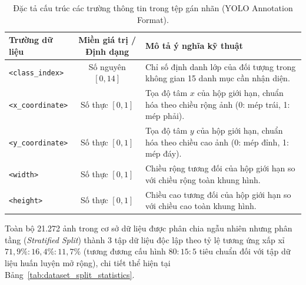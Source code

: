 \documentclass[12pt,a4paper]{article}
\begin{document}
\begin{table}[htbp]
\centering
\caption{Đặc tả cấu trúc các trường thông tin trong tệp gán nhãn (YOLO Annotation Format).}
\label{tab:details_of_annotations}
\small
\begin{tabular}{|l|c|p{8.5cm}|}
\hline
\textbf{Trường dữ liệu} & \textbf{Miền giá trị / Định dạng} & \textbf{Mô tả ý nghĩa kỹ thuật} \\ \hline
\texttt{<class\_index>} & Số nguyên $[0, 14]$ & Chỉ số định danh lớp của đối tượng trong không gian 15 danh mục cần nhận diện. \\ \hline
\texttt{<x\_coordinate>} & Số thực $[0, 1]$ & Tọa độ tâm $x$ của hộp giới hạn, chuẩn hóa theo chiều rộng ảnh (0: mép trái, 1: mép phải). \\ \hline
\texttt{<y\_coordinate>} & Số thực $[0, 1]$ & Tọa độ tâm $y$ của hộp giới hạn, chuẩn hóa theo chiều cao ảnh (0: mép đỉnh, 1: mép đáy). \\ \hline
\texttt{<width>} & Số thực $[0, 1]$ & Chiều rộng tương đối của hộp giới hạn so với chiều rộng toàn khung hình. \\ \hline
\texttt{<height>} & Số thực $[0, 1]$ & Chiều cao tương đối của hộp giới hạn so với chiều cao toàn khung hình. \\ \hline
\end{tabular}
\end{table}

Toàn bộ 21.272 ảnh trong cơ sở dữ liệu được phân chia ngẫu nhiên nhưng phân tầng (\textit{Stratified Split}) thành 3 tập dữ liệu độc lập theo tỷ lệ tương ứng xấp xỉ $71,9\% : 16,4\% : 11,7\%$ (tương đương cấu hình $80:15:5$ tiêu chuẩn đối với tập dữ liệu huấn luyện mở rộng), chi tiết thể hiện tại Bảng~\ref{tab:dataset_split_statistics}.

\begin{table}[htbp]
\centering
\caption{Phân chia bộ dữ liệu phục vụ huấn luyện, thẩm định và đánh giá kiểm thử.}
\label{tab:dataset_split_statistics}
\end{table}
\end{document}
